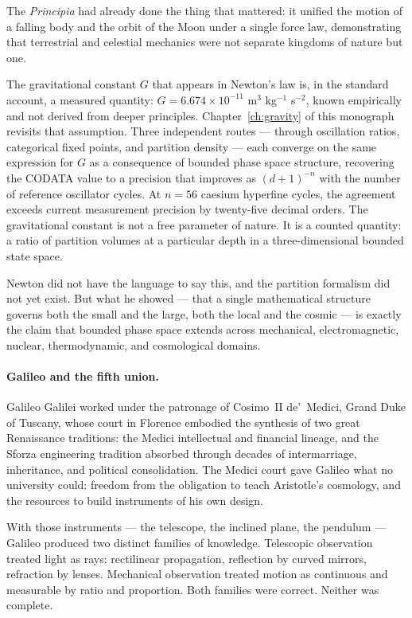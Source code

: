 The \textit{Principia} had already done the thing that mattered: it
unified the motion of a falling body and the orbit of the Moon under a
single force law, demonstrating that terrestrial and celestial mechanics
were not separate kingdoms of nature but one.

The gravitational constant $G$ that appears in Newton's law is, in the
standard account, a measured quantity: $G = 6.674\times10^{-11}$ m$^3$
kg$^{-1}$ s$^{-2}$, known empirically and not derived from deeper
principles.
Chapter~\ref{ch:gravity} of this monograph revisits that assumption.
Three independent routes --- through oscillation ratios, categorical
fixed points, and partition density --- each converge on the same
expression for $G$ as a consequence of bounded phase space structure,
recovering the CODATA value to a precision that improves as
$(d+1)^{-n}$ with the number of reference oscillator cycles.
At $n = 56$ caesium hyperfine cycles, the agreement exceeds current
measurement precision by twenty-five decimal orders.
The gravitational constant is not a free parameter of nature.
It is a counted quantity: a ratio of partition volumes at a particular
depth in a three-dimensional bounded state space.

Newton did not have the language to say this, and the partition formalism
did not yet exist.
But what he showed --- that a single mathematical structure governs both
the small and the large, both the local and the cosmic --- is exactly the
claim that bounded phase space extends across mechanical, electromagnetic,
nuclear, thermodynamic, and cosmological domains.

\bigskip
\paragraph{Galileo and the fifth union.}

Galileo Galilei worked under the patronage of Cosimo~II de'~Medici,
Grand Duke of Tuscany, whose court in Florence embodied the synthesis of
two great Renaissance traditions: the Medici intellectual and financial
lineage, and the Sforza engineering tradition absorbed through decades
of intermarriage, inheritance, and political consolidation.
The Medici court gave Galileo what no university could: freedom from
the obligation to teach Aristotle's cosmology, and the resources to
build instruments of his own design.

With those instruments --- the telescope, the inclined plane, the
pendulum --- Galileo produced two distinct families of knowledge.
Telescopic observation treated light as rays: rectilinear propagation,
reflection by curved mirrors, refraction by lenses.
Mechanical observation treated motion as continuous and measurable by
ratio and proportion.
Both families were correct.
Neither was complete.


